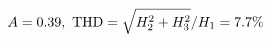 \documentclass[preview]{standalone}
\begin{document}
\begin{align*}
\special{dvisvgm:raw <g id='unique000'>}A=0.39,\ \text{THD}=\sqrt{H_2^2+H_3^2}/H_1=7.7\%\special{dvisvgm:raw </g>}
\end{align*}
\end{document}
